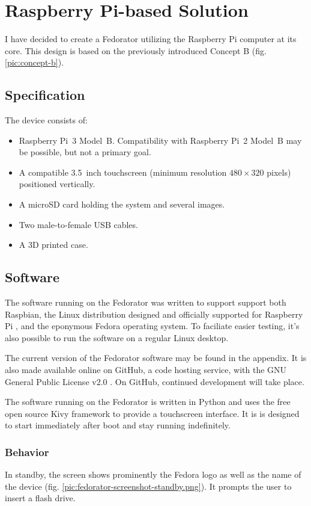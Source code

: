 \chapter{Raspberry Pi-based Solution}
    I have decided to create a Fedorator utilizing the Raspberry Pi computer at its core.  This design is based on the previously introduced Concept B (fig. \ref{pic:concept-b}).
    \section{Specification}
        The device consists of:
        \begin{itemize}
            \item Raspberry Pi~3 Model~B.  Compatibility with Raspberry Pi~2 Model~B may be possible, but not a primary goal.
            \item A compatible 3.5~inch touchscreen (minimum resolution $480\times320$ pixels) positioned vertically.
            \item A microSD card holding the system and several images.
            \item Two male-to-female USB cables.
            \item A 3D printed case.
        \end{itemize}
    
    \section{Software}
        The software running on the Fedorator was written to support support both Raspbian, the Linux distribution designed and officially supported for Raspberry Pi \cite{raspbian}, and the eponymous Fedora operating system.  To faciliate easier testing, it's also possible to run the software on a regular Linux desktop.
        
        The current version of the Fedorator software may be found in the appendix.  It is also made available online on GitHub, a code hosting service, with the GNU General Public License v2.0 \cite{fedorator-github}.  On GitHub, continued development will take place.
        
        The software running on the Fedorator is written in Python and uses the free open source Kivy framework \cite{kivy} to provide a touchscreen interface.  It is is designed to start immediately after boot and stay running indefinitely.
        
        \subsection{Behavior}
            In standby, the screen shows prominently the Fedora logo as well as the name of the device (fig. \ref{pic:fedorator-screenshot-standby.png}).  It prompts the user to insert a flash drive.
            
